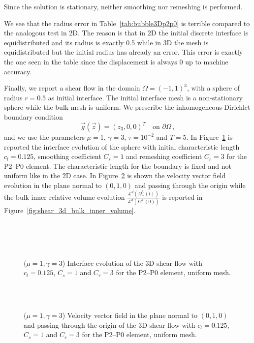 \documentclass[a4paper,12pt,onecolumn]{article}
\begin{document}
Since the solution is stationary, neither smoothing nor remeshing is performed.


We see that the radius error in Table~\ref{tab:bubble3Dp2p0} is terrible
compared to the analogous test in 2D. The reason is that in 2D the initial
discrete interface is equidistributed and its radius is exactly 0.5 while in 3D
the mesh is equidistributed but the initial radius has already an error. This
error is exactly the one seen in the table since the displacement is always 0 up
to machine accuracy.

Finally, we report a shear flow in the domain $\Omega=(-1,1)^3$, with a sphere
of radius $r=0.5$ as initial interface. The initial interface mesh is a
non-stationary sphere while the bulk mesh is uniform. We prescribe the
inhomogeneous Dirichlet boundary condition
\begin{equation*}
\vec g(\vec z)=(z_3,0,0)^T\quad \mbox{on }\partial\Omega\,,
\end{equation*}
and we use the parameters $\mu=1$, $\gamma=3$, $\tau=10^{-2}$ and $T=5$. In
Figure~\ref{fig:shear_3d} is reported the interface evolution of the sphere with
initial characteristic length $c_l=0.125$, smoothing coefficient $C_s=1$ and
remeshing coefficient $C_r=3$ for the P2--P0 element. The characteristic length
for the boundary is fixed and not uniform like in the 2D case. In
Figure~\ref{fig:shear_3d_velocity} is shown the velocity vector field evolution
in the plane normal to $(0,1,0)$ and passing through the origin while the bulk
inner relative volume evolution
$\frac{\mathcal{L}^d(\Omega^h_-(t))}{\mathcal{L}^d(\Omega^h_-(0))}$ is reported
in Figure~\ref{fig:shear_3d_bulk_inner_volume}.
\begin{figure}[htbp]
  \centering
  \\
  \quad
  \\
  \quad
  \\
  \caption{($\mu=1,\gamma=3$) Interface evolution of the 3D shear flow with
$c_l=0.125$, $C_s=1$ and $C_r=3$ for the P2--P0 element, uniform mesh.}
  \label{fig:shear_3d}
\end{figure}

\begin{figure}[htbp]
  \centering
  \quad
  \\
  \quad
  \\
  \caption{($\mu=1,\gamma=3$) Velocity vector field in the plane normal to
$(0,1,0)$ and passing through the origin of the 3D shear flow with $c_l=0.125$,
$C_s=1$ and $C_r=3$ for the P2--P0 element, uniform mesh.}
  \label{fig:shear_3d_velocity}
\end{figure}
\end{document}
